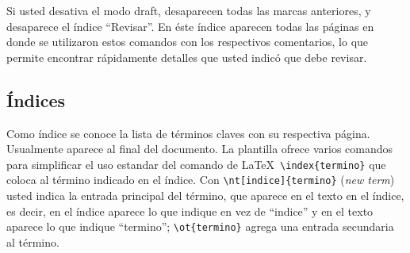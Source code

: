 
Si usted desativa el modo draft, desaparecen todas las marcas
anteriores, y desaparece el índice ``Revisar''.  En éste índice
aparecen todas las páginas en donde se utilizaron estos comandos con
los respectivos comentarios, lo que permite encontrar rápidamente
detalles que usted indicó que debe revisar.

\subsection{Índices}

Como índice se conoce la lista de términos claves con su respectiva
página.  Usualmente aparece al final del documento.  La plantilla
ofrece varios comandos para simplificar el uso estandar del comando de
\LaTeX\ \verb+\index{termino}+ que coloca al término indicado en el
índice.  Con \verb+\nt[indice]{termino}+ (\emph{new term}) usted
indica la entrada principal del término, que aparece en el texto en el
índice, es decir, en el índice aparece lo que indique en vez de
``indice'' y en el texto aparece lo que indique ``termino'';
\verb+\ot{termino}+ agrega una entrada secundaria al término.

